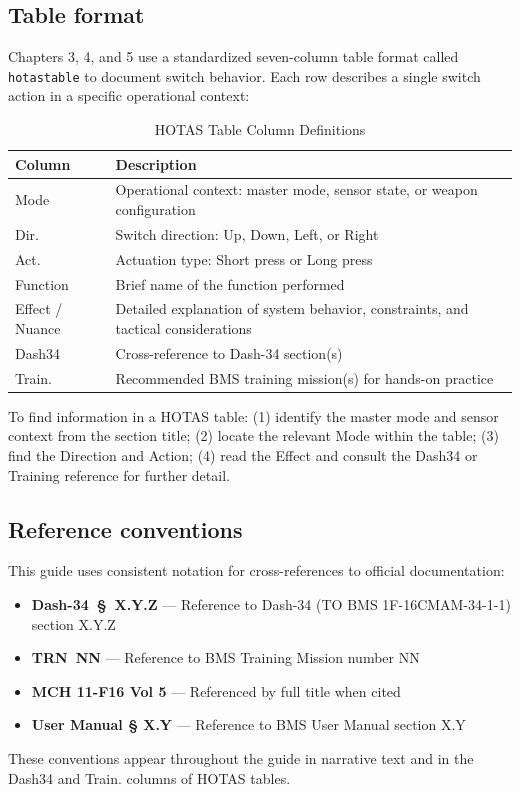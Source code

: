 \documentclass[11pt, a4paper, twoside]{report}
\providecommand{\dashref}[1]{Dash-34~\S~#1}
\providecommand{\trnref}[1]{TRN~#1}
\begin{document}
\subsection{Table format}
\label{sec:C1-S3-S2}

Chapters 3, 4, and 5 use a standardized seven-column table format called \texttt{hotastable} to document switch behavior. Each row describes a single switch action in a specific operational context:

\begin{table}[H]
	\centering
	\caption{HOTAS Table Column Definitions}
	\label{tab:C1-hotastable-format}
	\small
	\renewcommand{\arraystretch}{1.25}
	\begin{tabular}{L{2.2cm} L{11.5cm}}
		\toprule
		\textbf{Column} & \textbf{Description} \\
		\midrule
		Mode & Operational context: master mode, sensor state, or weapon configuration \\
		Dir. & Switch direction: Up, Down, Left, or Right \\
		Act. & Actuation type: Short press or Long press \\
		Function & Brief name of the function performed \\
		Effect / Nuance & Detailed explanation of system behavior, constraints, and tactical considerations \\
		Dash34 & Cross-reference to Dash-34 section(s) \\
		Train. & Recommended BMS training mission(s) for hands-on practice \\
		\bottomrule
	\end{tabular}
\end{table}

To find information in a HOTAS table: (1) identify the master mode and sensor context from the section title; (2) locate the relevant Mode within the table; (3) find the Direction and Action; (4) read the Effect and consult the Dash34 or Training reference for further detail.

\subsection{Reference conventions}
\label{sec:C1-S3-S3}

This guide uses consistent notation for cross-references to official documentation:
\begin{itemize}
	\item \textbf{\dashref{X.Y.Z}} --- Reference to Dash-34 (TO BMS 1F-16CMAM-34-1-1) section X.Y.Z
	\item \textbf{\trnref{NN}} --- Reference to BMS Training Mission number NN
	\item \textbf{MCH 11-F16 Vol 5} --- Referenced by full title when cited
	\item \textbf{User Manual § X.Y} --- Reference to BMS User Manual section X.Y
\end{itemize}
These conventions appear throughout the guide in narrative text and in the Dash34 and Train. columns of HOTAS tables.
\end{document}
